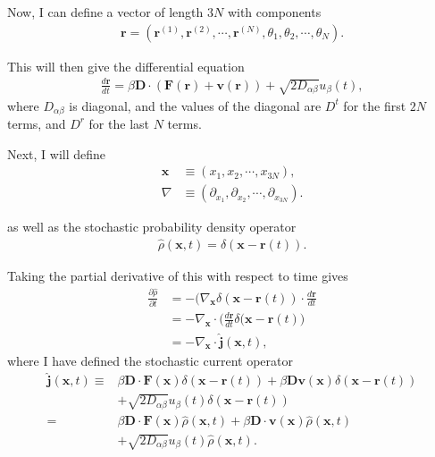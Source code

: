 \documentclass[../main.tex]{subfiles}
\begin{document}
Now, I can define a vector of length $3N$ with components
\begin{align}
  \bm{r}=(\bm{r}^{(1)},\bm{r}^{(2)},\cdots,\bm{r}^{(N)},\theta_1,\theta_2,\cdots,
  \theta_N).
\end{align}

This will then give the differential equation
\begin{align}
  \frac{d\bm{r}}{dt}=\beta\bm{D}\cdot(\bm{F}(\bm{r})+\bm{v}(\bm{r}))
  +\sqrt{2D_{\alpha\beta}}u_{\beta}(t),
\end{align}
where $D_{\alpha\beta}$ is diagonal, and the values of the diagonal are
$D^t$ for the first $2N$ terms, and $D^r$ for the last $N$ terms.

Next, I will define
\begin{align}
  \bm{x}&\equiv(x_1,x_2,\cdots,x_{3N}),\\
  \nabla&\equiv(\partial_{x_1},\partial_{x_2},\cdots,\partial_{x_{3N}}).
\end{align}

as well as the stochastic probability density operator
\begin{align}
  \hat{\rho}(\bm{x},t)=\delta(\bm{x}-\bm{r}(t)).
\end{align}

Taking the partial derivative of this with respect to time gives
\begin{align}
  \frac{\partial\hat{\rho}}{\partial t}
  &=-(\nabla_{\bm{x}}\delta(\bm{x}-\bm{r}(t))
  \cdot\frac{d\bm{r}}{dt}\nonumber\\
  &=-\nabla_{\bm{x}}\cdot\bigg(\frac{d\bm{r}}{dt}
  \delta(\bm{x}-\bm{r}(t)\bigg)\nonumber\\
  &=-\nabla_{\bm{x}}\cdot\hat{\bm{j}}(\bm{x},t),
\end{align}
where I have defined the stochastic current operator
\begin{align}
  \hat{\bm{j}}(\bm{x},t)\equiv
  &\beta\bm{D}\cdot\bm{F}(\bm{x})\delta(\bm{x}-\bm{r}(t))
  +\beta\bm{D}\bm{v}(\bm{x})\delta(\bm{x}-\bm{r}(t))\nonumber\\
  &+\sqrt{2D_{\alpha\beta}}u_{\beta}(t)
  \delta(\bm{x}-\bm{r}(t))\nonumber\\
  =&\beta\bm{D}\cdot\bm{F}(\bm{x})\hat{\rho}(\bm{x},t)
  +\beta\bm{D}\cdot\bm{v}(\bm{x})\hat{\rho}(\bm{x},t)\nonumber\\
  &+\sqrt{2D_{\alpha\beta}}u_{\beta}(t)\hat{\rho}(\bm{x},t).
\end{align}
\end{document}
